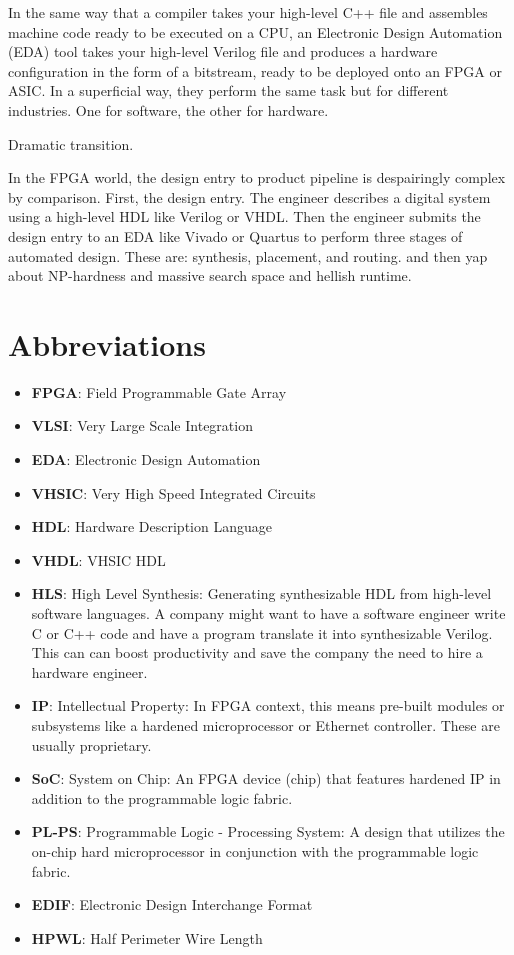 \documentclass{article}
\begin{document}
In the same way that a compiler takes your high-level C++ file and assembles machine code ready to be executed on a CPU, an Electronic Design Automation (EDA) tool takes your high-level Verilog file and produces a hardware configuration in the form of a bitstream, ready to be deployed onto an FPGA or ASIC. In a superficial way, they perform the same task but for different industries. One for software, the other for hardware.

Dramatic transition.

In the FPGA world, the design entry to product pipeline is despairingly complex by comparison. 
First, the design entry. The engineer describes a digital system using a high-level HDL like Verilog or VHDL. 
Then the engineer submits the design entry to an EDA like Vivado or Quartus to perform three stages of automated design. 
These are: synthesis, placement, and routing. and then yap about NP-hardness and massive search space and hellish runtime.

\section{Abbreviations}
\begin{itemize}[label={--}, left=0.25cm] %
    \item \textbf{FPGA}: Field Programmable Gate Array
    \item \textbf{VLSI}: Very Large Scale Integration
    \item \textbf{EDA}: Electronic Design Automation
    \item \textbf{VHSIC}: Very High Speed Integrated Circuits
    \item \textbf{HDL}: Hardware Description Language
    \item \textbf{VHDL}: VHSIC HDL
    \item \textbf{HLS}: High Level Synthesis: Generating synthesizable HDL from high-level software languages. A company might want to have a software engineer write C or C++ code and have a program translate it into synthesizable Verilog. This can can boost productivity and save the company the need to hire a hardware engineer.
    \item \textbf{IP}: Intellectual Property: In FPGA context, this means pre-built modules or subsystems like a hardened microprocessor or Ethernet controller. These are usually proprietary.
    \item \textbf{SoC}: System on Chip: An FPGA device (chip) that features hardened IP in addition to the programmable logic fabric.
    \item \textbf{PL-PS}: Programmable Logic - Processing System: A design that utilizes the on-chip hard microprocessor in conjunction with the programmable logic fabric.
    \item \textbf{EDIF}: Electronic Design Interchange Format
    \item \textbf{HPWL}: Half Perimeter Wire Length
\end{itemize}
\end{document}
